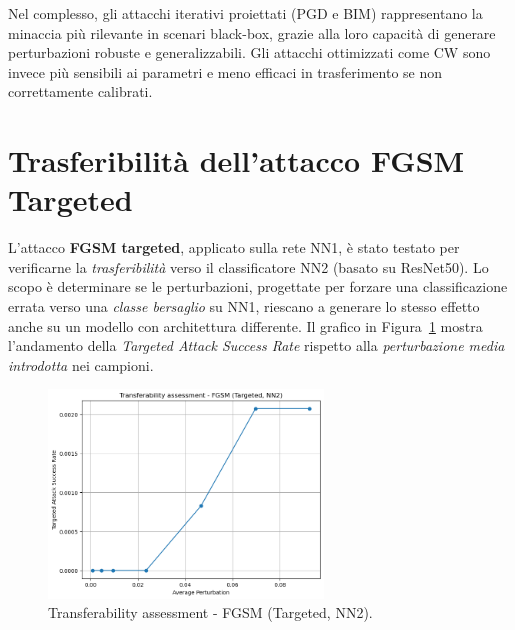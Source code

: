         \noindent Nel complesso, gli attacchi iterativi proiettati (PGD e BIM) rappresentano la minaccia più rilevante in scenari black-box, grazie alla loro capacità di generare perturbazioni robuste e generalizzabili. Gli attacchi ottimizzati come CW sono invece più sensibili ai parametri e meno efficaci in trasferimento se non correttamente calibrati.

    \section{Trasferibilità dell'attacco FGSM Targeted}
        L'attacco \textbf{FGSM targeted}, applicato sulla rete NN1, è stato testato per verificarne la \textit{trasferibilità} verso il classificatore NN2 (basato su ResNet50). Lo scopo è determinare se le perturbazioni, progettate per forzare una classificazione errata verso una \textit{classe bersaglio} su NN1, riescano a generare lo stesso effetto anche su un modello con architettura differente.
        Il grafico in Figura~\ref{fig:fgsm_targeted_transfer} mostra l'andamento della \textit{Targeted Attack Success Rate} rispetto alla \textit{perturbazione media introdotta} nei campioni.

        \begin{figure}[H]
          \centering
          \includegraphics[width=0.65\textwidth]{images/fgsm_targeted_transferability.png}
          \caption{Transferability assessment - FGSM (Targeted, NN2).}
          \label{fig:fgsm_targeted_transfer}
        \end{figure}

